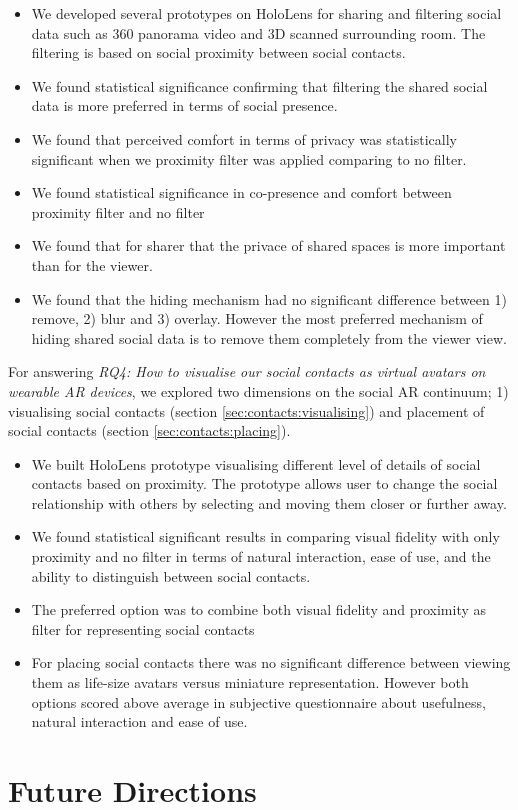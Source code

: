 \begin{itemize}
    \item{We developed several prototypes on HoloLens for sharing and filtering social data such as 360 panorama video and 3D scanned surrounding room. The filtering is based on social proximity between social contacts.}
    \item{We found statistical significance confirming that filtering the shared social data is more preferred in terms of social presence.}
    \item{We found that perceived comfort in terms of privacy was statistically significant when we proximity filter was applied comparing to no filter.}
    \item{We found statistical significance in co-presence and comfort between proximity filter and no filter}
    \item{We found that for sharer that the privace of shared spaces is more important than for the viewer.}
    \item{We found that the hiding mechanism had no significant difference between 1) remove, 2) blur and 3) overlay. However the most preferred mechanism of hiding shared social data is to remove them completely from the viewer view.}
\end{itemize}

For answering \textit{RQ4: How to visualise our social contacts as virtual avatars on wearable AR devices}, we explored two dimensions on the social AR continuum; 1) visualising social contacts (section \ref{sec:contacts:visualising}) and placement of social contacts (section \ref{sec:contacts:placing}). 

\begin{itemize}
    \item{We built HoloLens prototype visualising different level of details of social contacts based on proximity. The prototype allows user to change the social relationship with others by selecting and moving them closer or further away.}
    \item{We found statistical significant results in comparing visual fidelity with only proximity and no filter in terms of natural interaction, ease of use, and the ability to distinguish between social contacts.}
    \item{The preferred option was to combine both visual fidelity and proximity as filter for representing social contacts}
    \item{For placing social contacts there was no significant difference between viewing them as life-size avatars versus miniature representation. However both options scored above average in subjective questionnaire about usefulness, natural interaction and ease of use.}
\end{itemize}

\pagebreak
\section{Future Directions}
